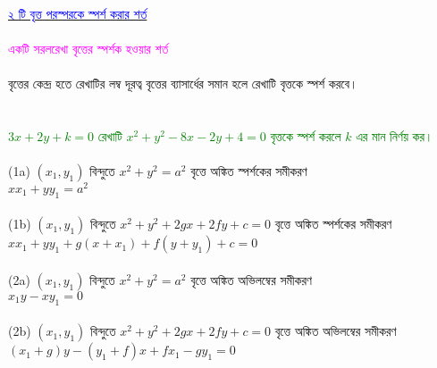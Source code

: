 \documentclass{article}
\begin{document}
	\\
	\href{https://www.youtube.com/watch?v=zsiv_hlMIR0}{\textcolor{blue}{২ টি বৃত্ত পরস্পরকে স্পর্শ করার শর্ত}}\\
	\\
	\textcolor{magenta}{একটি সরলরেখা বৃত্তের স্পর্শক হওয়ার শর্ত }\\
	\\
	বৃত্তের কেন্দ্র হতে রেখাটির লম্ব দূরত্ব বৃত্তের ব্যাসার্ধের সমান হলে রেখাটি বৃত্তকে স্পর্শ করবে।\\
	\\ 
	\\
	\textcolor{green}{$3x+2y+k=0$ রেখাটি  $x^2+y^2-8x-2y+4=0$ বৃত্তকে স্পর্শ করলে $k$ এর মান  নির্ণয় কর।}\\
	\\
	(1a) $(x_1,y_1)$ বিন্দুতে   $x^2+y^2=a^2$  বৃত্তে অঙ্কিত স্পর্শকের সমীকরণ \\
	 $xx_1+yy_1=a^2$\\
	\\ 
	(1b) $(x_1,y_1)$ বিন্দুতে  $x^2+y^2+2gx+2fy+c=0$  বৃত্তে অঙ্কিত স্পর্শকের সমীকরণ \\   $xx_1+yy_1+g(x+x_1)+f(y+y_1)+c=0$\\
\\ 
(2a) $(x_1,y_1)$ বিন্দুতে   $x^2+y^2=a^2$  বৃত্তে অঙ্কিত অভিলম্বের  সমীকরণ \\
$x_1y-xy_1=0$\\
\\ 
(2b) $(x_1,y_1)$ বিন্দুতে  $x^2+y^2+2gx+2fy+c=0$  বৃত্তে অঙ্কিত অভিলম্বের সমীকরণ \\   $(x_1+g)y-(y_1+f)x+fx_1-gy_1=0$\\
\end{document}
